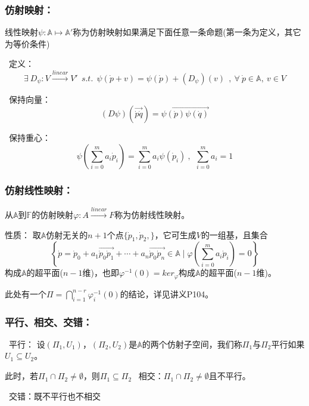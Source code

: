 \documentclass[zihao=5,UTF8]{report}
\def\F{\mathbb{F}}
\def\A{\mathbb{A}}
\theoremstyle{mystyle} %
\begin{document}
\subsubsection{仿射映射：}
线性映射$\psi: \A \longmapsto \A'$称为仿射映射如果满足下面任意一条命题(第一条为定义，其它为等价条件)
\par{}\  定义：
\begin{equation*}
    \exists\  D_{\psi}: V \overset{linear}{\longrightarrow}V'\ \ s.t.\ \   \psi(\dot{p}+v) = \psi(\dot{p}) + (D_\psi)(v) \ \ ,\ \forall\ \dot{p}\in \A,\ v \in V
\end{equation*}   \par
{}\   保持向量：
\begin{equation*}
    (D\psi)(\overrightarrow{\dot{p}\dot{q}}) = \overrightarrow{\psi(\dot{p})\psi(\dot{q})}
\end{equation*}  \par
{}\  保持重心：
\begin{equation*}
    \psi\left(\sum_{i=0}^{m} a_i\dot{p}_i \right) = \sum_{i=0}^{m} a_i\psi(\dot{p}_i)\ ,\ \ \sum_{i=0}^{m} a_i = 1
\end{equation*} 


\subsubsection{仿射线性映射：}
从$\A$到$\F$的仿射映射$\varphi: A \overset{linear}{\longrightarrow} F$称为仿射线性映射。\par
性质：
取$\A$仿射无关的$n+1$个点$\{\dot{p}_1,\dot{p}_2,\}$，它可生成$V$的一组基，且集合
\begin{equation*}
    \left\{ \dot{p} = \dot{p}_0 + a_1\overrightarrow{\dot{p}_0\dot{p}_1} + \cdots + a_n\overrightarrow{\dot{p}_0\dot{p}_n} \in \A \mid \varphi(\sum_{i=0}^{m} a_i\dot{p}_i) = 0 \right\}
\end{equation*}
构成$\A$的超平面($n-1$维)，也即$\varphi^{-1}(0)= ker_\varphi $构成$\A$的超平面($n-1$维)。
{\par\color{gray}\small
此处有一个$\Pi  = \bigcap_{i=1}^{n-r}\varphi^{-1}_i(0) $的结论，详见讲义P104。
\par}

\subsubsection{平行、相交、交错：}
\par{}\ 平行： 设$(\Pi_1, U_1)$，$(\Pi_2, U_2)$是$\A$的两个仿射子空间，我们称$\Pi_1$与$\Pi_2$平行如果$U_1 \subseteq U_2$。\par
此时，若$\Pi_1 \cap \Pi_2 \ne \emptyset$，则$\Pi_1 \subseteq \Pi_2$
\  相交：$ \Pi_1 \cap \Pi_2 \ne \emptyset$且不平行。   \par
{}\  交错：既不平行也不相交 \par
\end{document}
